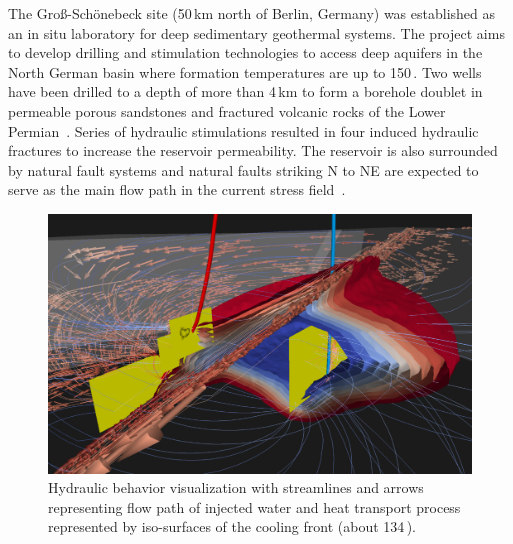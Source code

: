 \documentclass[twocolumn]{svjour3}          %
\begin{document}
The Gro{\ss}-Sch\"onebeck site (50\,km north of Berlin, Germany) was established as an in situ laboratory for deep sedimentary geothermal systems. The project aims to develop drilling and stimulation technologies to access deep aquifers in the North German basin where formation temperatures are up to 150\,\celsius. Two wells have been drilled to a depth of more than 4\,km to form a borehole doublet in permeable porous sandstones and fractured volcanic rocks of the Lower Permian~\cite{zimmermann:geothermal}. Series of hydraulic stimulations resulted in four induced hydraulic fractures to increase the reservoir permeability. The reservoir is also surrounded by natural fault systems and natural faults striking N to NE are expected to serve as the main flow path in the current stress field~\cite{bloecher:geothermal}.

\begin{figure}[htb]
  \includegraphics[width=\linewidth]{images/geothermal.jpg}
\caption{Hydraulic behavior visualization with streamlines and arrows representing flow path of injected water and heat transport process represented by iso-surfaces of the cooling front (about 134\,\celsius).}
\label{fig:geothermal}
\end{figure}
\end{document}
